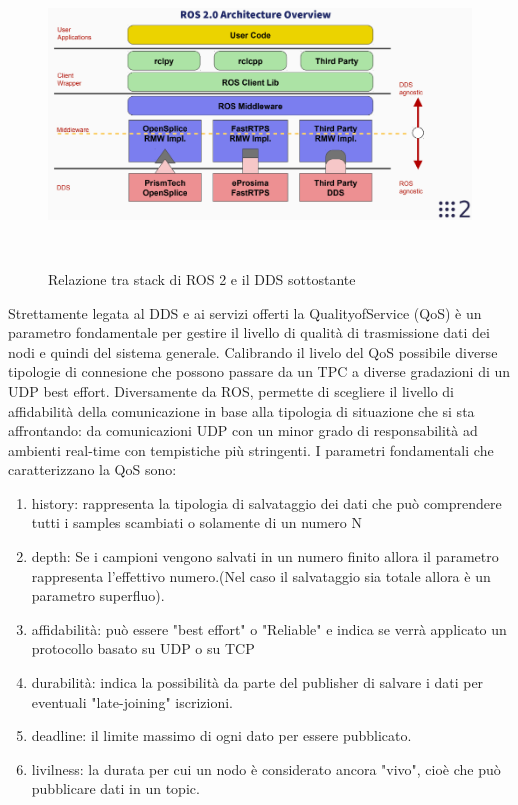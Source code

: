 \documentclass[a4paper,11 pt,oneside]{book}
\theoremstyle{definition}
\begin{document}
\begin{figure}[htbp]
\includegraphics[width=12cm, height=8cm]{DDS2.png}
\caption{Relazione tra stack di ROS 2 e il DDS sottostante}
\label{DDS}
\end{figure}

Strettamente legata al DDS e ai servizi offerti la QualityofService (QoS) è un parametro fondamentale per gestire il
livello di qualità di trasmissione dati dei nodi e quindi del sistema generale. Calibrando il livelo del QoS
possibile diverse tipologie di connesione che possono passare da un TPC a diverse
gradazioni di un UDP best effort. Diversamente da ROS, permette di scegliere il livello di affidabilità della comunicazione in base alla tipologia di situazione che si sta affrontando: da comunicazioni UDP con un minor grado di responsabilità ad ambienti real-time con tempistiche più stringenti. I parametri fondamentali che caratterizzano la QoS sono:
\begin{enumerate}
\item history: rappresenta la tipologia di salvataggio dei dati che può comprendere tutti i samples scambiati o solamente di un numero N
\item depth: Se i campioni vengono salvati in un numero finito allora il parametro rappresenta l'effettivo numero.(Nel caso il salvataggio sia totale allora è un parametro superfluo).
\item affidabilità: può essere "best effort" o "Reliable" e indica se verrà applicato un protocollo basato su UDP o su TCP
\item durabilità: indica la possibilità da parte del publisher di salvare i dati per eventuali "late-joining" iscrizioni.
\item deadline: il limite massimo di ogni dato per essere pubblicato.
\item livilness: la durata per cui un nodo è considerato ancora "vivo", cioè che può pubblicare dati in un topic.
\end{enumerate}
\end{document}

